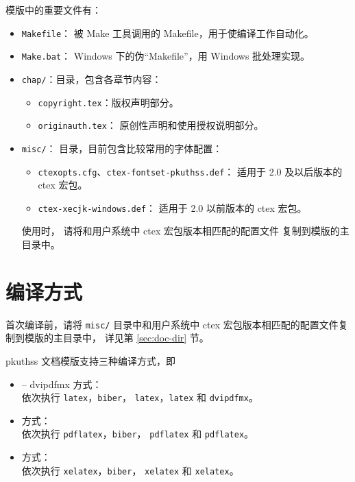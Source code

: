 模版中的重要文件有：
\begin{itemize}
	\item \verb|Makefile|：
		被 Make 工具调用的 Makefile，用于使编译工作自动化。
	\item \verb|Make.bat|：%
		Windows 下的伪“Makefile”，用 Windows 批处理实现。

	\item \verb|chap/|：目录，包含各章节内容：
	\begin{itemize}
		\item \verb|copyright.tex|：版权声明部分。
		\item \verb|originauth.tex|：
			原创性声明和使用授权说明部分。
	\end{itemize}

	\item \verb|misc/|：
		目录，目前包含比较常用的字体配置：
	\begin{itemize}
		\item \verb|ctexopts.cfg|、\verb|ctex-fontset-pkuthss.def|：
			适用于 2.0 及以后版本的 ctex 宏包。
		\item \verb|ctex-xecjk-windows.def|：
			适用于 2.0 以前版本的 ctex 宏包。
	\end{itemize}
	使用时，
	请将和用户系统中 ctex 宏包版本相匹配的配置文件
	复制到模版的主目录中。
\end{itemize}

\section{编译方式}\label{sec:compile}

首次编译前，请将 \verb|misc/| 目录中和用户系统中
ctex 宏包版本相匹配的配置文件复制到模版的主目录中，
详见第 \ref{sec:doc-dir} 节。

pkuthss 文档模版支持三种编译方式，即
\begin{itemize}
	\item {} -- dvipdfmx 方式：\\
		依次执行 \verb|latex|，\verb|biber|，%
		\verb|latex|，\verb|latex| 和 \verb|dvipdfmx|。
	\item {} 方式：\\
		依次执行 \verb|pdflatex|，\verb|biber|，%
		\verb|pdflatex| 和 \verb|pdflatex|。
	\item {} 方式：\\
		依次执行 \verb|xelatex|，\verb|biber|，%
		\verb|xelatex| 和 \verb|xelatex|。
\end{itemize}

